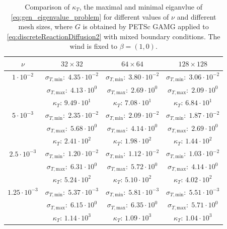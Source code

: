 \documentclass[hidelinks,onefignum,onetabnum]{siamart220329}
\begin{document}
\begin{table}
    \centering
    \caption{Comparison of $\kappa_T$, the maximal and minimal eiganvlue of \eqref{eq:gen_eigenvalue_problem} for different values of $\nu$ and different mesh sizes, where $G$ is obtained by PETSc GAMG applied to \eqref{eq:discreteReactionDiffusion2} with mixed boundary conditions.
        The wind is fixed to $\beta = (1,0)$.}
    \label{tab:spectral_reactionDiffusionAMG_mixed}
%
    \begin{tabular}{c|c|c|c}
        \toprule
        $\nu$               & $32\times 32$ & $64\times 64$ & $128\times 128$ \\
        \midrule
        $1\cdot 10^{-2}$    & $\sigma_{T,\text{min}}:\;4.35\cdot 10^{-2}$ & $\sigma_{T,\text{min}}:\;3.80\cdot 10^{-2}$ & $\sigma_{T,\text{min}}:\;3.06\cdot 10^{-2}$ \\
                            & $\sigma_{T,\text{max}}:\;4.13\cdot 10^{0}$ & $\sigma_{T,\text{max}}:\;2.69\cdot 10^{0}$ & $\sigma_{T,\text{max}}:\;2.09\cdot 10^{0}$ \\
                            & $\kappa_T:\,9.49\cdot 10^{1}$ & $\kappa_T:\,7.08\cdot 10^{1}$ & $\kappa_T:\,6.84\cdot 10^{1}$ \\
        \midrule
        $5\cdot 10^{-3}$    & $\sigma_{T,\text{min}}:\;2.35\cdot 10^{-2}$ & $\sigma_{T,\text{min}}:\;2.09\cdot 10^{-2}$ & $\sigma_{T,\text{min}}:\;1.87\cdot 10^{-2}$ \\
                            & $\sigma_{T,\text{max}}:\;5.68\cdot 10^{0}$ & $\sigma_{T,\text{max}}:\;4.14\cdot 10^{0}$ & $\sigma_{T,\text{max}}:\;2.69\cdot 10^{0}$ \\
                            & $\kappa_T:\,2.41\cdot 10^{2}$ & $\kappa_T:\,1.98\cdot 10^{2}$ & $\kappa_T:\,1.44\cdot 10^{2}$ \\
        \midrule
        $2.5\cdot 10^{-3}$  & $\sigma_{T,\text{min}}:\;1.20\cdot 10^{-2}$ & $\sigma_{T,\text{min}}:\;1.12\cdot 10^{-2}$ & $\sigma_{T,\text{min}}:\;1.03\cdot 10^{-2}$ \\
                            & $\sigma_{T,\text{max}}:\;6.31\cdot 10^{0}$ & $\sigma_{T,\text{max}}:\;5.72\cdot 10^{0}$ & $\sigma_{T,\text{max}}:\;4.14\cdot 10^{0}$ \\
                            & $\kappa_T:\,5.24\cdot 10^{2}$ & $\kappa_T:\,5.10\cdot 10^{2}$ & $\kappa_T:\,4.02\cdot 10^{2}$ \\
        \midrule
        $1.25\cdot 10^{-3}$ & $\sigma_{T,\text{min}}:\;5.37\cdot 10^{-3}$ & $\sigma_{T,\text{min}}:\;5.81\cdot 10^{-3}$ & $\sigma_{T,\text{min}}:\;5.51\cdot 10^{-3}$ \\
                            & $\sigma_{T,\text{max}}:\;6.15\cdot 10^{0}$ & $\sigma_{T,\text{max}}:\;6.35\cdot 10^{0}$ & $\sigma_{T,\text{max}}:\;5.71\cdot 10^{0}$ \\
                            & $\kappa_T:\,1.14\cdot 10^{3}$ & $\kappa_T:\,1.09\cdot 10^{3}$ & $\kappa_T:\,1.04\cdot 10^{3}$ \\
        \bottomrule
    \end{tabular}
    \vspace{1cm}
\end{table}
\end{document}
